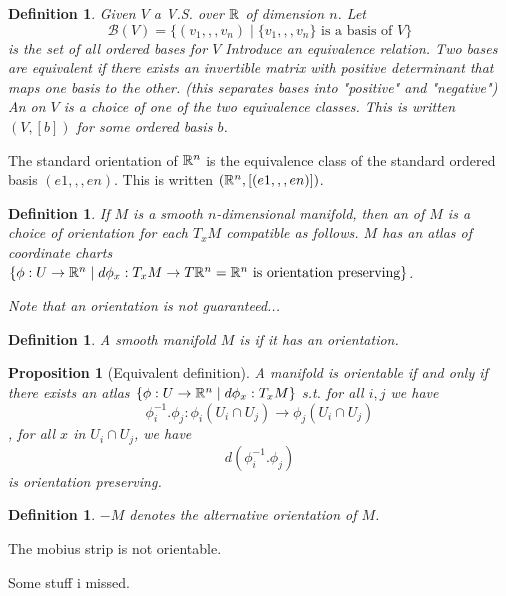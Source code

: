 \documentclass[11pt]{amsbook}
\newenvironment{dateenv}{
	\vspace{1em}
}{
	\vspace{1em}
}
\newcommand{\mydate}[4]{
	\newdate{#1}{#2}{#3}{#4}
	\begin{dateenv}
		\hfill\displaydate{#1}
	\end{dateenv}
}
\theoremstyle{mystyle} \newtheorem{thrm}[thm]{Theorem}
\theoremstyle{mystyle} \newtheorem{defi}[thm]{Definition}
\theoremstyle{mystyle} \newtheorem{coro}[thm]{Corollary}
\theoremstyle{mystyle} \newtheorem{propo}[thm]{Proposition}
\theoremstyle{mystyle} \newtheorem{lemm}[thm]{Lemma}
\numberwithin{thm}{section}
\begin{document}
\begin{defi}
	Given $V$ a V.S. over ${\mathbb R}$ of dimension $n$.
	Let $$\mathcal{B}(V) = \{ (v_1,,,v_n) \mid \{v_1,,,v_n\} \text{ is a basis of } V \}$$ is the set of all ordered bases for $V$
	Introduce an equivalence relation.  Two bases are equivalent if there exists an invertible matrix with positive determinant that maps one basis to the other.   (this separates bases into "positive" and "negative")
	An  on $V$ is a choice of one of the two equivalence classes.  This is written $(V, [b])$ for some ordered basis $b$.
\end{defi}
\begin{example}
	The standard orientation of ${\mathbb R}^n$ is the equivalence class of the standard ordered basis $(e1,,,en)$.  This is written $({\mathbb R}^n, [(e1,,,en)])$.
\end{example}
\begin{defi}
	If $M$ is a smooth $n$-dimensional manifold, then an  of $M$ is a choice of orientation for each $T_xM$ compatible as follows.  $M$ has an atlas of coordinate charts $\{ \phi : U \to {\mathbb R}^n \mid d\phi_x : T_xM \to T{\mathbb R}^n = {\mathbb R}^n \text{ is orientation preserving} \}$.

	Note that an orientation is not guaranteed...
\end{defi}
\begin{defi}
	A smooth manifold $M$ is  if it has an orientation.
\end{defi}
\begin{propo}[Equivalent definition]
	A manifold is orientable if and only if there exists an atlas $\{ \phi : U \to {\mathbb R}^n \mid d\phi_x : T_xM \}$ s.t. for all $i,j$ we have $$\phi_i^{-1}.\phi_j : \phi_i(U_i \cap U_j) \to \phi_j(U_i \cap U_j)$$
	, for all $x$ in $U_i \cap U_j$, we have $$d(\phi_i^{-1}.\phi_j)$$ is orientation preserving.
\end{propo}
\begin{defi}
	$-M$ denotes the alternative orientation of $M$.
\end{defi}
\begin{example}
	The mobius strip is not orientable.
\end{example}

\mydate{d14}{16}{11}{2016}

Some stuff i missed.
\end{document}

